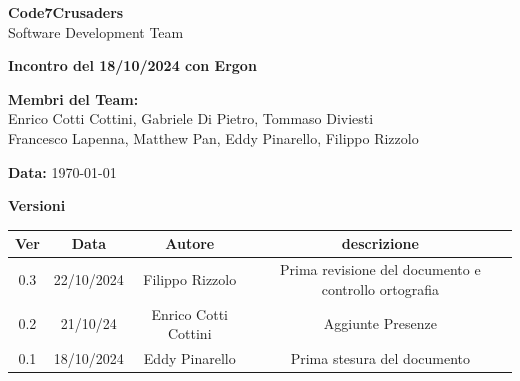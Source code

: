 \documentclass{article}
\begin{document}
\begin{titlepage}
    {\Huge \textbf{Code7Crusaders}}\\
    \vspace{0.5cm}
    {\Large Software Development Team}\\
    \vspace{2cm}
    
    {\large \textbf{Incontro del 18/10/2024 con Ergon}}\\
    \vspace{5cm}

    \textbf{Membri del Team:}\\
    Enrico Cotti Cottini, Gabriele Di Pietro, Tommaso Diviesti \\
    Francesco Lapenna, Matthew Pan, Eddy Pinarello, Filippo Rizzolo \\
    \vspace{0.5cm}
    
    {\large \textbf{Data:}} \today\\
    
    \vspace{1cm}
\end{titlepage}

\tableofcontents
\newpage
\begin{center}
    \textbf{Versioni}
    \\
    \begin{tabular}{|c|c|c|c|}
        \hline
        \textbf{Ver} & \textbf{Data} & \textbf{Autore} & \textbf{descrizione}\\
        \hline
        0.3 & 22/10/2024 & Filippo Rizzolo & Prima revisione del documento e controllo ortografia \\ 
        \hline
	    0.2 & 21/10/24 & Enrico Cotti Cottini & Aggiunte Presenze \\
	    \hline
        0.1 & 18/10/2024 & Eddy Pinarello & Prima stesura del documento \\ 
        \hline
    \end{tabular}
\end{center}


\newpage
\end{document}
